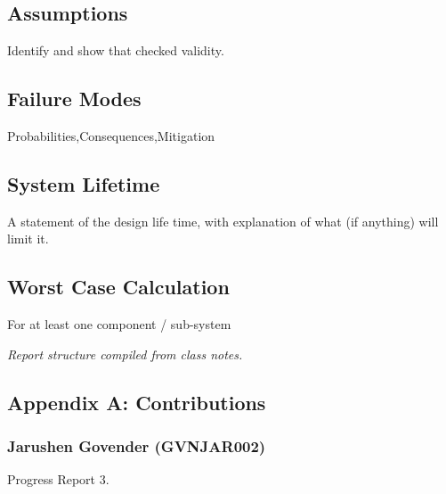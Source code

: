 \subsection{Assumptions}
Identify and show that checked validity.
\subsection{Failure Modes}
Probabilities,Consequences,Mitigation
\subsection{System Lifetime}
A statement of the design life time, with explanation of what (if anything) will limit it.
\subsection{Worst Case Calculation}
For at least one component / sub-system 

\textit{Report structure compiled from class notes.}\cite{handout}\cite{notes}



\newpage





\newpage
\vspace*{\fill}
\begin{center}
\subsection*{Appendix A: Contributions}
\end{center}
\vspace*{\fill}

\newpage
\subsubsection*{Jarushen Govender (GVNJAR002)}
Progress Report 3.
